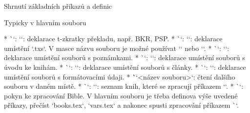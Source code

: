 %
%
%
%
%
%
%
%
%
%
%
%
%
%
\sec[suma] Shrnutí základních příkazů a definic


\secc Typicky v hlavním souboru

\begitems
* \`\tmark`: `\def\tmark{<t-zkratka>}`: deklarace t-zkratky překladu, např. BKR, PSP.
* \`\txsfile`: `\def\txsfile {<maska názvu souboru>}`: deklarace umístění `.txs`. 
  V masce názvu souboru je možné používat `\amark` nebo `\bmark`. 
* \`\notesfile`: `\def\notesfile {<maska názvu souboru>}`: deklarace umístění
   souborů s poznámkami. 
* \`\introfile`: `\def\introfile {<maska názvu souboru>}`: deklarace umístění
   souborů s úvodu ke knihám. 
* \`\articlefile`: `\def\articlefile {<maska názvu souboru>}`: deklarace umístění
   souborů s články.
* \`\fmtfile`: `\def\fmtfile {<maska názvu souboru>}`: deklarace umístění
   souborů s formátovacími údaji. 
* \```{<název souboru>}`: čtení dalšího souboru v daném místě.
* \`\printedbooks`: `\def\printedbooks {<seznam a-značek knih>}`:
  seznam knih, které se zpracují příkazem `\processbooks`.
* \`\processbooks`: pokyn ke zpracování Bible.
\enditems
V hlavním souboru je třeba definova výše uvedené příkazy, 
přečíst `books.tex`, `vars.tex` a nakonec spusti zpracování příkazem
\`\processboks`.


